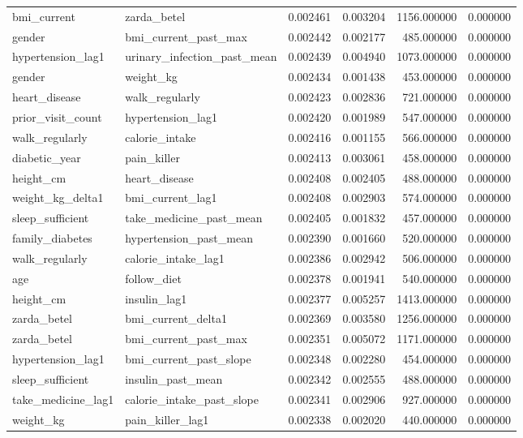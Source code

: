 \begin{longtable}{llrrrr}
bmi\_current & zarda\_betel & 0.002461 & 0.003204 & 1156.000000 & 0.000000 \\
gender & bmi\_current\_past\_max & 0.002442 & 0.002177 & 485.000000 & 0.000000 \\
hypertension\_lag1 & urinary\_infection\_past\_mean & 0.002439 & 0.004940 & 1073.000000 & 0.000000 \\
gender & weight\_kg & 0.002434 & 0.001438 & 453.000000 & 0.000000 \\
heart\_disease & walk\_regularly & 0.002423 & 0.002836 & 721.000000 & 0.000000 \\
prior\_visit\_count & hypertension\_lag1 & 0.002420 & 0.001989 & 547.000000 & 0.000000 \\
walk\_regularly & calorie\_intake & 0.002416 & 0.001155 & 566.000000 & 0.000000 \\
diabetic\_year & pain\_killer & 0.002413 & 0.003061 & 458.000000 & 0.000000 \\
height\_cm & heart\_disease & 0.002408 & 0.002405 & 488.000000 & 0.000000 \\
weight\_kg\_delta1 & bmi\_current\_lag1 & 0.002408 & 0.002903 & 574.000000 & 0.000000 \\
sleep\_sufficient & take\_medicine\_past\_mean & 0.002405 & 0.001832 & 457.000000 & 0.000000 \\
family\_diabetes & hypertension\_past\_mean & 0.002390 & 0.001660 & 520.000000 & 0.000000 \\
walk\_regularly & calorie\_intake\_lag1 & 0.002386 & 0.002942 & 506.000000 & 0.000000 \\
age & follow\_diet & 0.002378 & 0.001941 & 540.000000 & 0.000000 \\
height\_cm & insulin\_lag1 & 0.002377 & 0.005257 & 1413.000000 & 0.000000 \\
zarda\_betel & bmi\_current\_delta1 & 0.002369 & 0.003580 & 1256.000000 & 0.000000 \\
zarda\_betel & bmi\_current\_past\_max & 0.002351 & 0.005072 & 1171.000000 & 0.000000 \\
hypertension\_lag1 & bmi\_current\_past\_slope & 0.002348 & 0.002280 & 454.000000 & 0.000000 \\
sleep\_sufficient & insulin\_past\_mean & 0.002342 & 0.002555 & 488.000000 & 0.000000 \\
take\_medicine\_lag1 & calorie\_intake\_past\_slope & 0.002341 & 0.002906 & 927.000000 & 0.000000 \\
weight\_kg & pain\_killer\_lag1 & 0.002338 & 0.002020 & 440.000000 & 0.000000 \\

\end{longtable}
